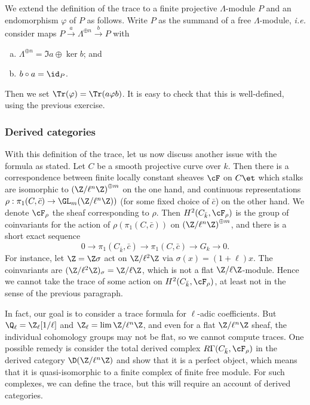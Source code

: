 We extend the definition of the trace to a finite projective $\Lambda$-module $P$ and an endomorphism $\varphi$ of $P$ as follows. Write $P$ as the summand of a free $\Lambda$-module, {\it i.e.} consider maps $P \xrightarrow{a} \Lambda^{\oplus n} \xrightarrow{b} P$ with 
\begin{enumerate}[(a)]
\item
$\Lambda^{\oplus n} = \Im a \oplus \ker b$; and
\item
$b\circ a = \id_P$.
\end{enumerate}
Then we set $\Tr(\varphi) = \Tr(a\varphi b)$. It is easy to check that this is well-defined, using the previous exercise.

\subsubsection*{Derived categories}

With this definition of the trace, let us now discuss another issue with the formula as stated. Let $C$ be a smooth projective curve over $k$. Then there is a correspondence between finite locally constant sheaves $\cF$ on $C\et$ which stalks are isomorphic to ${(\Z/\ell^n\Z)}^{\oplus m}$ on the one hand, and continuous representations $\rho : \pi_1 (C,\bar c) \to \GL_m(\Z/\ell^n\Z))$ (for some fixed choice of $\bar c$) on the other hand. We denote $\cF_\rho$ the sheaf corresponding to $\rho$. Then $H^2 (C_{\bar k}, \cF_\rho)$ is the group of coinvariants for the action of $\rho(\pi_1 (C,\bar c))$ on ${(\Z/\ell^n\Z)}^{\oplus m}$, and there is a short exact sequence
$$
0 \longrightarrow \pi_1 (C_{\bar k},\bar c)  \longrightarrow \pi_1 (C,\bar c)  \longrightarrow G_k  \longrightarrow 0.
$$
For instance, let $\Z = \Z \sigma$ act on $\Z/\ell^2\Z$ via $\sigma(x) = (1+\ell) x$. The coinvariants are $(\Z/\ell^2\Z)_{\sigma} = \Z/\ell\Z$, which is not a flat $\Z/\ell\Z$-module. Hence we cannot take the trace of some action on $H^2(C_{\bar k}, \cF_\rho)$, at least not in the sense of the previous paragraph. 

In fact, our goal is to consider a trace formula for $\ell$-adic coefficients. But $\Q_\ell = \Z_\ell[1/\ell]$ and $\Z_\ell = \lim \Z/\ell^n\Z$, and even for a flat $\Z/\ell^n\Z$ sheaf, the individual cohomology groups may not be flat, so we cannot compute traces. One possible remedy is consider the total derived complex $R\Gamma(C_{\bar k}, \cF_\rho)$ in the derived category $\D(\Z/\ell^n\Z)$ and show that it is a perfect object, which means that it is quasi-isomorphic to a finite complex of finite free module. For such complexes, we can define the trace, but this will require an account of derived categories.

